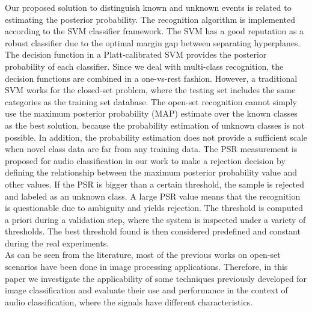 \documentclass{ieeeaccess}
\begin{document}
Our proposed solution to distinguish known and unknown events is related to estimating the posterior probability. The recognition algorithm is implemented according to the SVM classifier framework. The SVM has a good reputation as a robust classifier due to the optimal margin gap between separating hyperplanes. The decision function in a Platt-calibrated SVM provides the posterior probability of each classifier. Since we deal with multi-class recognition, the decision functions are combined in a one-vs-rest fashion. 
However, a traditional SVM works for the closed-set problem, where the testing set includes the same categories as the training set database. The open-set recognition cannot simply use the maximum posterior probability (MAP) estimate over the known classes as the best solution, because the probability estimation of unknown classes is not possible. In addition, the probability estimation does not provide a sufficient scale when novel class data are far from any training data. The PSR measurement is proposed for audio classification in our work to make a rejection decision by defining the relationship between the maximum posterior probability value and other values. If the PSR is bigger than a certain threshold, the sample is rejected and labeled as an unknown class. A large PSR value means that the recognition is questionable due to ambiguity and yields rejection. The threshold is computed a priori during a validation step, where the system is inspected under a variety of thresholds. The best threshold found is then considered predefined and constant during the real experiments.\\
As can be seen from the literature, most of the previous works on open-set scenarios have been done in image processing applications. Therefore, in this paper we investigate the applicability of some techniques previously developed for image classification and evaluate their use and performance in the context of audio classification, where the signals have different characteristics.
 
\end{document}
